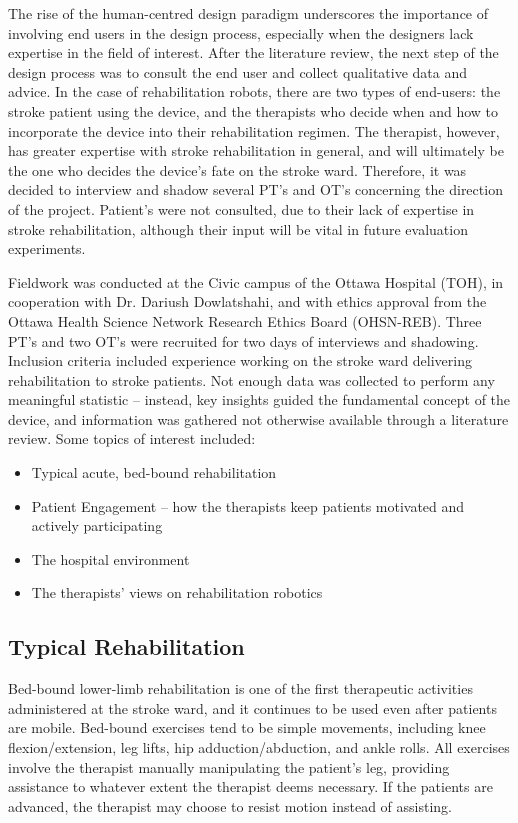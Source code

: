 \documentclass[12pt]{report}
\begin{document}
	The rise of the human-centred design paradigm underscores the importance of involving end users in the design process, especially when the designers lack expertise in the field of interest. After the literature review, the next step of the design process was to consult the end user and collect qualitative data and advice. In the case of rehabilitation robots, there are two types of end-users: the stroke patient using the device, and the therapists who decide when and how to incorporate the device into their rehabilitation regimen. The therapist, however, has greater expertise with stroke rehabilitation in general, and will ultimately be the one who decides the device's fate on the stroke ward. Therefore, it was decided to interview and shadow several PT's and OT's concerning the direction of the project. Patient's were not consulted, due to their lack of expertise in stroke rehabilitation, although their input will be vital in future evaluation experiments. 
	
	Fieldwork was conducted at the Civic campus of the Ottawa Hospital (TOH), in cooperation with Dr. Dariush Dowlatshahi, and with ethics approval from the Ottawa Health Science Network Research Ethics Board (OHSN-REB). Three PT's and two OT's were recruited for two days of interviews and shadowing. Inclusion criteria included experience working on the stroke ward delivering rehabilitation to stroke patients. Not enough data was collected to perform any meaningful statistic -- instead, key insights guided the fundamental concept of the device, and information was gathered not otherwise available through a literature review. Some topics of interest included:
	
	\begin{itemize}
		\item Typical acute, bed-bound rehabilitation 
		\item Patient Engagement -- how the therapists keep patients motivated and actively participating 
		\item The hospital environment
		\item The therapists' views on rehabilitation robotics 
	\end{itemize}

	
	\subsection{Typical Rehabilitation}
	
	Bed-bound lower-limb rehabilitation is one of the first therapeutic activities administered at the stroke ward, and it continues to be used even after patients are mobile. Bed-bound exercises tend to be simple movements, including knee flexion/extension, leg lifts, hip adduction/abduction, and ankle rolls. All exercises involve the therapist manually manipulating the patient's leg, providing assistance to whatever extent the therapist deems necessary. If the patients are advanced, the therapist may choose to resist motion instead of assisting. 
	
\end{document}
